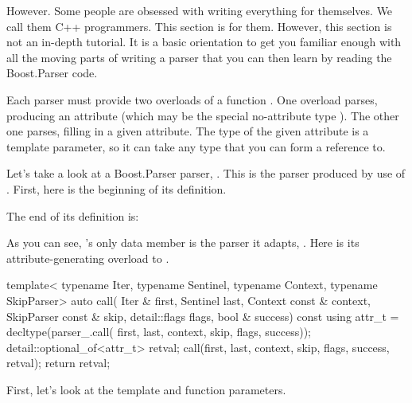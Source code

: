 \documentclass{MyBook}
\begin{document}
However. Some people are obsessed with writing everything for themselves. We call them C++ programmers. This section is for them. However, this section is not an in-depth tutorial. It is a basic orientation to get you familiar enough with all the moving parts of writing a parser that you can then learn by reading the Boost.Parser code.

Each parser must provide two overloads of a function . One overload parses, producing an attribute (which may be the special no-attribute type ). The other one parses, filling in a given attribute. The type of the given attribute is a template parameter, so it can take any type that you can form a reference to.

Let's take a look at a Boost.Parser parser, . This is the parser produced by use of . First, here is the beginning of its definition.

\begin{code}
template<typename Parser>
struct opt_parser
{
\end{code}

The end of its definition is:

\begin{code}
    Parser parser_;
};
\end{code}

As you can see, 's only data member is the parser it adapts, . Here is its attribute-generating overload to .

\begin{code}
template<
    typename Iter,
    typename Sentinel,
    typename Context,
    typename SkipParser>
auto call(
    Iter & first,
    Sentinel last,
    Context const & context,
    SkipParser const & skip,
    detail::flags flags,
    bool & success) const
{
    using attr_t = decltype(parser_.call(
        first, last, context, skip, flags, success));
    detail::optional_of<attr_t> retval;
    call(first, last, context, skip, flags, success, retval);
    return retval;
}
\end{code}

First, let's look at the template and function parameters.
\end{document}
